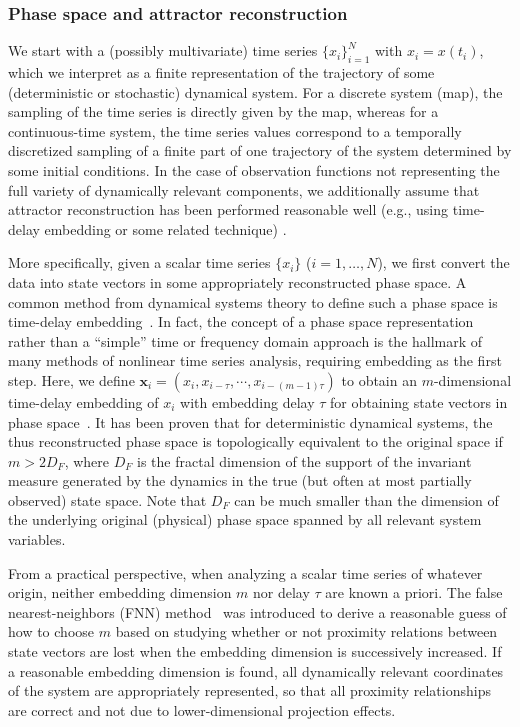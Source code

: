 		\subsubsection{Phase space and attractor reconstruction}
		We start with a (possibly multivariate) time series $\{x_i\}_{i=1}^N$ with $x_i=x(t_i)$, which we interpret as a finite representation of the trajectory of some (deterministic or stochastic) dynamical system. For a discrete system (map), the sampling of the time series is directly given by the map, whereas for a continuous-time system, the time series values correspond to a temporally discretized sampling of a finite part of one trajectory of the system determined by some initial conditions. In the case of observation functions not representing the full variety of dynamically relevant components, we additionally assume that attractor reconstruction has been performed reasonable well (e.g., using time-delay embedding or some related technique) \cite{Fraser1986,kantz1997,Kennel1992,Takens1981}. 
		
		More specifically, given a scalar time series $\{x_i\}$ ($i=1,\dots,N$), we first convert the data into state vectors in some appropriately reconstructed phase space. A common method from dynamical systems theory to define such a phase space is time-delay embedding~\cite{Takens1981}. In fact, the concept of a phase space representation rather than a ``simple'' time or frequency domain approach is the hallmark of many methods of nonlinear time series analysis, requiring embedding as the first step. Here, we define $\mathbf{x}_i = (x_i, x_{i-\tau}, \cdots, x_{i-(m-1)\tau})$ to obtain an $m$-dimensional time-delay embedding of $x_i$ with embedding delay $\tau$ for obtaining state vectors in phase space~\cite{Takens1981}. It has been proven that for deterministic dynamical systems, the thus reconstructed phase space is topologically equivalent to the original space if $m > 2 D_F$, where $D_F$ is the fractal dimension of the support of the invariant measure generated by the dynamics in the true (but often at most partially observed) state space. Note that $D_F$ can be much smaller than the dimension of the underlying original (physical) phase space spanned by all relevant system variables. 
		
		From a practical perspective, when analyzing a scalar time series of whatever origin, neither embedding dimension $m$ nor delay $\tau$ are known a priori. The false nearest-neighbors (FNN) method~\cite{Kennel1992} was introduced to derive a reasonable guess of how to choose $m$ based on studying whether or not proximity relations between state vectors are lost when the embedding dimension is successively increased. If a reasonable embedding dimension is found, all dynamically relevant coordinates of the system are appropriately represented, so that all proximity relationships are correct and not due to lower-dimensional projection effects. 
		
